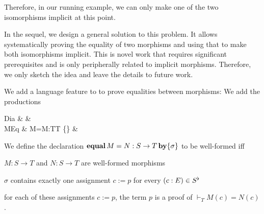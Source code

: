Therefore, in our running example, we can only make one of the two isomorphisms implicit at this point.

In the sequel, we design a general solution to this problem.
It allows systematically proving the equality of two morphisms and using that to make both isomorphisms implicit.
This is novel work that requires significant prerequisites and is only peripherally related to implicit morphisms.
Therefore, we only sketch the idea and leave the details to future work.

We add a language feature to \mmt to prove equalities between morphisms:
We add the productions
\begin{grammar}
Dia   &   &\\
MEq   &  M=M:T\to T  \{\} &\\
\end{grammar}


We define the declaration $\operatorname{\mathbf{equal}} M=N:S\to T \operatorname{\mathbf{by}} \{\sigma\}$ to be well-formed iff
\begin{compactitem} 
  \item $M:S\to T$ and $N:S\to T$ are well-formed morphisms
  \item $\sigma$ contains exactly one assignment $c:=p$ for every $(c:E)\in S^\flat$
  \item for each of these assignments $c:=p$, the term $p$ is a proof of $\vdash_T M(c)=N(c)$.
\end{compactitem}

